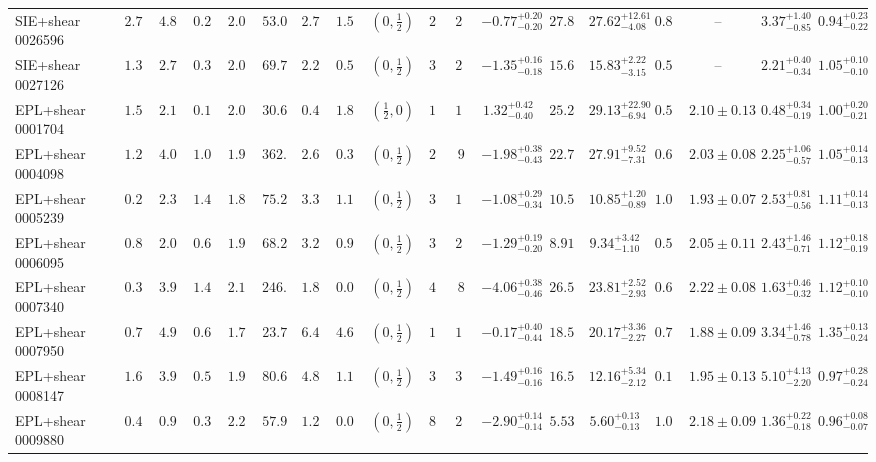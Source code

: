 \begin{longtable}{@{}lccccccccccccccccc@{}}
SIE+shear 0026596 & $2.76$ & $4.88$ & $0.26$ & $2.00$ & $53.0$ & $2.77$ & $1.59$ & $(0,\frac12)$ & $27$ & $23$ & $-0.77^{+0.20}_{-0.20}$ & $27.83$ & $27.62^{+12.61}_{-4.08}$ & $0.86$ & -- & $3.37^{+1.40}_{-0.85}$ & $0.94^{+0.23}_{-0.22}$\\
SIE+shear 0027126 & $1.31$ & $2.77$ & $0.39$ & $2.00$ & $69.7$ & $2.27$ & $0.54$ & $(0,\frac12)$ & $36$ & $20$ & $-1.35^{+0.16}_{-0.18}$ & $15.65$ & $15.83^{+2.22}_{-3.15}$ & $0.53$ & -- & $2.21^{+0.40}_{-0.34}$ & $1.05^{+0.10}_{-0.10}$\\
EPL+shear 0001704 & $1.55$ & $2.18$ & $0.17$ & $2.05$ & $30.6$ & $0.49$ & $1.84$ & $(\frac12,0)$ & $13$ & $11$ & $1.32^{+0.42}_{-0.40}$ & $25.20$ & $29.13^{+22.90}_{-6.94}$ & $0.56$ & $2.10\pm0.13$ & $0.48^{+0.34}_{-0.19}$ & $1.00^{+0.20}_{-0.21}$\\
EPL+shear 0004098 & $1.25$ & $4.00$ & $1.04$ & $1.96$ & $362.0$ & $2.60$ & $0.39$ & $(0,\frac12)$ & $25$ & $9$ & $-1.98^{+0.38}_{-0.43}$ & $22.70$ & $27.91^{+9.52}_{-7.31}$ & $0.60$ & $2.03\pm0.08$ & $2.25^{+1.06}_{-0.57}$ & $1.05^{+0.14}_{-0.13}$\\
EPL+shear 0005239 & $0.26$ & $2.33$ & $1.44$ & $1.82$ & $75.2$ & $3.32$ & $1.11$ & $(0,\frac12)$ & $37$ & $11$ & $-1.08^{+0.29}_{-0.34}$ & $10.55$ & $10.85^{+1.20}_{-0.89}$ & $1.00$ & $1.93\pm0.07$ & $2.53^{+0.81}_{-0.56}$ & $1.11^{+0.14}_{-0.13}$\\
EPL+shear 0006095 & $0.81$ & $2.00$ & $0.64$ & $1.93$ & $68.2$ & $3.21$ & $0.94$ & $(0,\frac12)$ & $36$ & $20$ & $-1.29^{+0.19}_{-0.20}$ & $8.91$ & $9.34^{+3.42}_{-1.10}$ & $0.53$ & $2.05\pm0.11$ & $2.43^{+1.46}_{-0.71}$ & $1.12^{+0.18}_{-0.19}$\\
EPL+shear 0007340 & $0.37$ & $3.90$ & $1.41$ & $2.11$ & $246.9$ & $1.80$ & $0.03$ & $(0,\frac12)$ & $40$ & $8$ & $-4.06^{+0.38}_{-0.46}$ & $26.54$ & $23.81^{+2.52}_{-2.93}$ & $0.69$ & $2.22\pm0.08$ & $1.63^{+0.46}_{-0.32}$ & $1.12^{+0.10}_{-0.10}$\\
EPL+shear 0007950 & $0.79$ & $4.93$ & $0.64$ & $1.72$ & $23.7$ & $6.40$ & $4.66$ & $(0,\frac12)$ & $17$ & $10$ & $-0.17^{+0.40}_{-0.44}$ & $18.52$ & $20.17^{+3.36}_{-2.27}$ & $0.76$ & $1.88\pm0.09$ & $3.34^{+1.46}_{-0.78}$ & $1.35^{+0.13}_{-0.24}$\\
EPL+shear 0008147 & $1.67$ & $3.97$ & $0.54$ & $1.92$ & $80.6$ & $4.82$ & $1.10$ & $(0,\frac12)$ & $35$ & $30$ & $-1.49^{+0.16}_{-0.16}$ & $16.53$ & $12.16^{+5.34}_{-2.12}$ & $0.16$ & $1.95\pm0.13$ & $5.10^{+4.13}_{-2.20}$ & $0.97^{+0.28}_{-0.24}$\\
EPL+shear 0009880 & $0.48$ & $0.94$ & $0.39$ & $2.29$ & $57.9$ & $1.29$ & $0.07$ & $(0,\frac12)$ & $81$ & $24$ & $-2.90^{+0.14}_{-0.14}$ & $5.53$ & $5.60^{+0.13}_{-0.13}$ & $1.00$ & $2.18\pm0.09$ & $1.36^{+0.22}_{-0.18}$ & $0.96^{+0.08}_{-0.07}$\\

\end{longtable}
